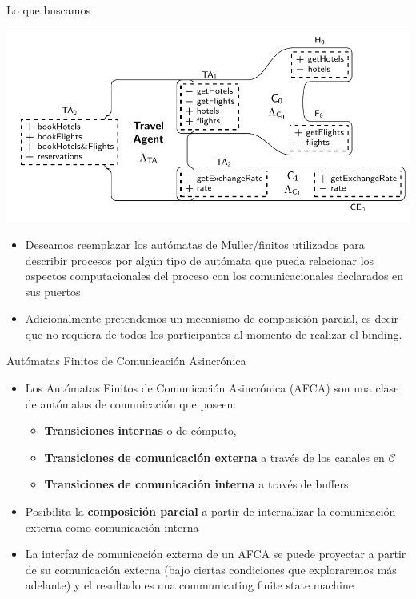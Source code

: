 \documentclass[10pt,xcolor={table,dvipsnames},t]{beamer}
\begin{document}

\begin{frame}{Lo que buscamos}
 \vspace{\fill}
\begin{center}
    \includegraphics[scale=0.5]{images/ARN0.png}
\end{center}
 \vspace{\fill}
\begin{itemize}
\item Deseamos reemplazar los autómatas de Muller/finitos utilizados para describir procesos por algún tipo de autómata que pueda relacionar los aspectos computacionales del proceso con los comunicacionales declarados en sus puertos.
\item Adicionalmente pretendemos un mecanismo de composición parcial, es decir que no requiera de todos los participantes al momento de realizar el binding.
\end{itemize}
 \vspace{\fill}
\end{frame}

\begin{frame}{Autómatas Finitos de Comunicación Asincrónica}
 \vspace{\fill}
\begin{itemize}
    \item Los Autómatas Finitos de Comunicación Asincrónica (AFCA) son una clase de autómatas de comunicación que poseen:
    \begin{itemize}
        \item \textbf{Transiciones internas} o de cómputo,
        \item \textbf{Transiciones de comunicación externa} a través de los canales en $\mathcal{C}$
        \item \textbf{Transiciones de comunicación interna} a través de buffers
    \end{itemize} 
    \item Posibilita la \textbf{composición parcial} a partir de internalizar la comunicación externa como comunicación interna
    \item La interfaz de comunicación externa de un AFCA se puede proyectar a partir de su comunicación externa (bajo ciertas condiciones que exploraremos más adelante) y el resultado es una communicating finite state machine
\end{itemize}
 \vspace{\fill}
\end{frame}
\end{document}
